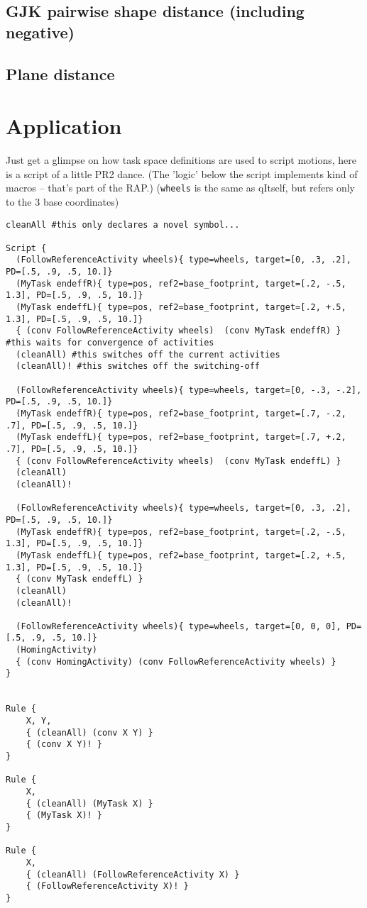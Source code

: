 \documentclass[10pt,fleqn,twoside]{article}
\begin{document}
\subsection{GJK pairwise shape distance (including negative)}

\subsection{Plane distance}

\section{Application}

Just get a glimpse on how task space definitions are used to script
motions, here is a script of a little PR2 dance. (The 'logic' below
the script implements kind of macros -- that's part of the RAP.)
(\texttt{wheels} is the same as qItself, but refers only to the 3 base coordinates)

\begin{shaded}
\begin{Verbatim}[fontfamily=courier,fontsize=\tiny]
cleanAll #this only declares a novel symbol...

Script {
  (FollowReferenceActivity wheels){ type=wheels, target=[0, .3, .2], PD=[.5, .9, .5, 10.]}
  (MyTask endeffR){ type=pos, ref2=base_footprint, target=[.2, -.5, 1.3], PD=[.5, .9, .5, 10.]}
  (MyTask endeffL){ type=pos, ref2=base_footprint, target=[.2, +.5, 1.3], PD=[.5, .9, .5, 10.]}
  { (conv FollowReferenceActivity wheels)  (conv MyTask endeffR) }  #this waits for convergence of activities
  (cleanAll) #this switches off the current activities
  (cleanAll)! #this switches off the switching-off

  (FollowReferenceActivity wheels){ type=wheels, target=[0, -.3, -.2], PD=[.5, .9, .5, 10.]}
  (MyTask endeffR){ type=pos, ref2=base_footprint, target=[.7, -.2, .7], PD=[.5, .9, .5, 10.]}
  (MyTask endeffL){ type=pos, ref2=base_footprint, target=[.7, +.2, .7], PD=[.5, .9, .5, 10.]}
  { (conv FollowReferenceActivity wheels)  (conv MyTask endeffL) }
  (cleanAll)
  (cleanAll)!

  (FollowReferenceActivity wheels){ type=wheels, target=[0, .3, .2], PD=[.5, .9, .5, 10.]}
  (MyTask endeffR){ type=pos, ref2=base_footprint, target=[.2, -.5, 1.3], PD=[.5, .9, .5, 10.]}
  (MyTask endeffL){ type=pos, ref2=base_footprint, target=[.2, +.5, 1.3], PD=[.5, .9, .5, 10.]}
  { (conv MyTask endeffL) }
  (cleanAll)
  (cleanAll)!

  (FollowReferenceActivity wheels){ type=wheels, target=[0, 0, 0], PD=[.5, .9, .5, 10.]}
  (HomingActivity)
  { (conv HomingActivity) (conv FollowReferenceActivity wheels) }
}


Rule {
    X, Y, 
    { (cleanAll) (conv X Y) }
    { (conv X Y)! }
}

Rule {
    X, 
    { (cleanAll) (MyTask X) }
    { (MyTask X)! }
}

Rule {
    X, 
    { (cleanAll) (FollowReferenceActivity X) }
    { (FollowReferenceActivity X)! }
}
\end{Verbatim}
\end{shaded}
\end{document}
